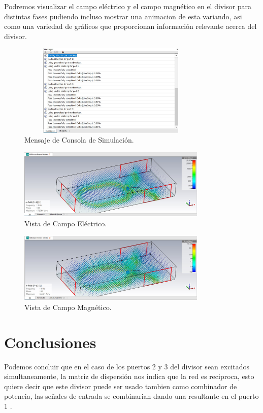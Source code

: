 \documentclass[a4paper]{IEEEtran} %
\begin{document}
Podremos visualizar el campo eléctrico y el campo magnético en el divisor para distintas fases pudiendo incluso mostrar una animacion de esta variando, asi como una variedad de gráficos que proporcionan información relevante acerca del divisor.

\begin{figure}[h]    
    \centering
    \includegraphics[width=9cm,height=4.4cm]{imagenes/img13}
    \caption{Mensaje de Consola de Simulación.}
    \label{fig:modelamiento8}
\end{figure}
\vspace{10mm}
\begin{figure}[h]    
    \centering
    \includegraphics[width=9cm]{imagenes/img15}
    \caption{Vista de Campo Eléctrico.}
    \label{fig:modelamiento9}
\end{figure}
\begin{figure}[h]    
    \centering
    \includegraphics[width=9cm]{imagenes/img16}
    \caption{Vista de Campo Magnético.}
    \label{fig:modelamiento10}
\end{figure}
\section{Conclusiones}
Podemos concluir que en el caso de los puertos 2 y 3 del divisor sean excitados simultaneamente, la matriz de dispersión nos indica que la red es reciproca, esto quiere decir que este divisor puede ser usado tambien como combinador de potencia, las señales de entrada se combinarian dando una resultante en el puerto 1 \cite{wilkinson1960n}.
\end{document}
